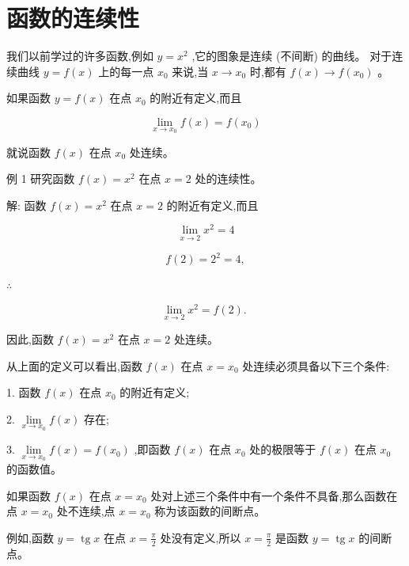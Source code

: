 \documentclass[lang=cn,newtx,12pt,scheme=chinese]{elegantbook}
\begin{document}
\section{函数的连续性}

我们以前学过的许多函数,例如 \(y = {x}^{2}\) ,它的图象是连续 (不间断) 的曲线。 对于连续曲线 \(y = f\left( x\right)\) 上的每一点 \({x}_{0}\) 来说,当 \(x \rightarrow {x}_{0}\) 时,都有 \(f\left( x\right) \rightarrow f\left( {x}_{0}\right)\) 。

\begin{definition}[函数的连续性] 
如果函数 \(y = f\left( x\right)\) 在点 \({x}_{0}\) 的附近有定义,而且

\[
\mathop{\lim }\limits_{{x \rightarrow {x}_{0}}}f\left( x\right) = f\left( {x}_{0}\right)
\]

就说函数 \(f\left( x\right)\) 在点 \({x}_{0}\) 处连续。
\end{definition}

例 1 研究函数 \(f\left( x\right) = {x}^{2}\) 在点 \(x = 2\) 处的连续性。

解: 函数 \(f\left( x\right) = {x}^{2}\) 在点 \(x = 2\) 的附近有定义,而且

\[
\mathop{\lim }\limits_{{x \rightarrow 2}}{x}^{2} = 4
\]

\[
f\left( 2\right) = {2}^{2} = 4,
\]

\(\therefore\)

\[
\mathop{\lim }\limits_{{x \rightarrow 2}}{x}^{2} = f\left( 2\right) \text{. }
\]

因此,函数 \(f\left( x\right) = {x}^{2}\) 在点 \(x = 2\) 处连续。

从上面的定义可以看出,函数 \(f\left( x\right)\) 在点 \(x = {x}_{0}\) 处连续必须具备以下三个条件:

1. 函数 \(f\left( x\right)\) 在点 \({x}_{0}\) 的附近有定义;

2. \(\mathop{\lim }\limits_{{x \rightarrow {x}_{0}}}f\left( x\right)\) 存在;

3. \(\mathop{\lim }\limits_{{x \rightarrow {x}_{0}}}f\left( x\right) = f\left( {x}_{0}\right)\) ,即函数 \(f\left( x\right)\) 在点 \({x}_{0}\) 处的极限等于 \(f\left( x\right)\) 在点 \({x}_{0}\) 的函数值。

如果函数 \(f\left( x\right)\) 在点 \(x = {x}_{0}\) 处对上述三个条件中有一个条件不具备,那么函数在点 \(x = {x}_{0}\) 处不连续,点 \(x = {x}_{0}\) 称为该函数的间断点。

例如,函数 \(y = \operatorname{tg}x\) 在点 \(x = \frac{\pi }{2}\) 处没有定义,所以 \(x = \frac{\pi }{2}\) 是函数 \(y = \operatorname{tg}x\) 的间断点。
\end{document}
